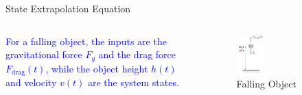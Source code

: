 \begin{frame}{State Extrapolation Equation}
\begin{columns}
        \textcolor{blue}{For a falling object, the inputs are the gravitational force $F_g$ and the drag force $F_{\text{drag}}(t)$, while the object height $h(t)$ and velocity $v(t)$ are the system states.}
        \begin{figure}
            \centering
            \includegraphics[width=0.3\textwidth]{Figures//Chapter2/FallingObject.png}
            \vspace{-10pt}
            \caption{Falling Object}
            \label{fig:FallingObject}
        \end{figure}
\end{columns}

\end{frame}    

